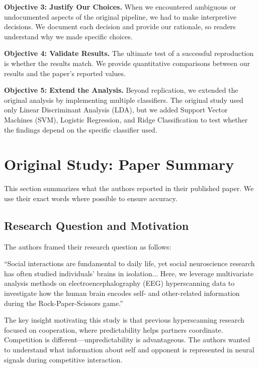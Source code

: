 \documentclass[11pt,a4paper]{article}
\begin{document}
\textbf{Objective 3: Justify Our Choices.} When we encountered ambiguous or undocumented aspects of the original pipeline, we had to make interpretive decisions. We document each decision and provide our rationale, so readers understand why we made specific choices.

\textbf{Objective 4: Validate Results.} The ultimate test of a successful reproduction is whether the results match. We provide quantitative comparisons between our results and the paper's reported values.

\textbf{Objective 5: Extend the Analysis.} Beyond replication, we extended the original analysis by implementing multiple classifiers. The original study used only Linear Discriminant Analysis (LDA), but we added Support Vector Machines (SVM), Logistic Regression, and Ridge Classification to test whether the findings depend on the specific classifier used.


\section{Original Study: Paper Summary}
\label{sec:paper_summary}

This section summarizes what the authors reported in their published paper. We use their exact words where possible to ensure accuracy.

\subsection{Research Question and Motivation}
\label{subsec:research_question}

The authors framed their research question as follows:

\begin{paperquote}
``Social interactions are fundamental to daily life, yet social neuroscience research has often studied individuals' brains in isolation... Here, we leverage multivariate analysis methods on electroencephalography (EEG) hyperscanning data to investigate how the human brain encodes self- and other-related information during the Rock-Paper-Scissors game.''
\end{paperquote}

The key insight motivating this study is that previous hyperscanning research focused on cooperation, where predictability helps partners coordinate. Competition is different---unpredictability is advantageous. The authors wanted to understand what information about self and opponent is represented in neural signals during competitive interaction.
\end{document}
